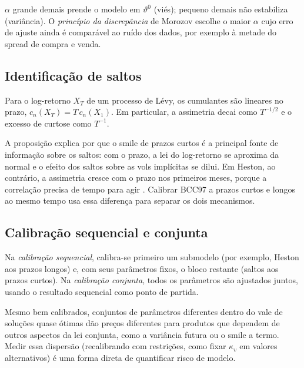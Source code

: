 \begin{observacao}
$\alpha$ grande demais prende o modelo em $\vartheta^0$ (viés); pequeno demais não estabiliza (variância). O \emph{princípio da discrepância} de Morozov escolhe o maior $\alpha$ cujo erro de ajuste ainda é comparável ao ruído dos dados, por exemplo à metade do spread de compra e venda.
\end{observacao}

\subsection{Identificação de saltos}

\begin{proposicao}[Cumulantes]
Para o log-retorno $X_T$ de um processo de Lévy, os cumulantes são lineares no prazo, $c_n(X_T)=T\,c_n(X_1)$. Em particular, a assimetria decai como $T^{-1/2}$ e o excesso de curtose como $T^{-1}$.
\end{proposicao}

A proposição explica por que o smile de prazos curtos é a principal fonte de informação sobre os saltos: com o prazo, a lei do log-retorno se aproxima da normal e o efeito dos saltos sobre as vols implícitas se dilui. Em Heston, ao contrário, a assimetria cresce com o prazo nos primeiros meses, porque a correlação precisa de tempo para agir \citep{gatheral2006}. Calibrar BCC97 a prazos curtos e longos ao mesmo tempo usa essa diferença para separar os dois mecanismos.

\subsection{Calibração sequencial e conjunta}

\begin{definicao}[Estratégias]
Na \emph{calibração sequencial}, calibra-se primeiro um submodelo (por exemplo, Heston aos prazos longos) e, com seus parâmetros fixos, o bloco restante (saltos aos prazos curtos). Na \emph{calibração conjunta}, todos os parâmetros são ajustados juntos, usando o resultado sequencial como ponto de partida.
\end{definicao}

\begin{observacao}
Mesmo bem calibrados, conjuntos de parâmetros diferentes dentro do vale de soluções quase ótimas dão preços diferentes para produtos que dependem de outros aspectos da lei conjunta, como a variância futura ou o smile a termo. Medir essa dispersão (recalibrando com restrições, como fixar $\kappa_v$ em valores alternativos) é uma forma direta de quantificar risco de modelo.
\end{observacao}
